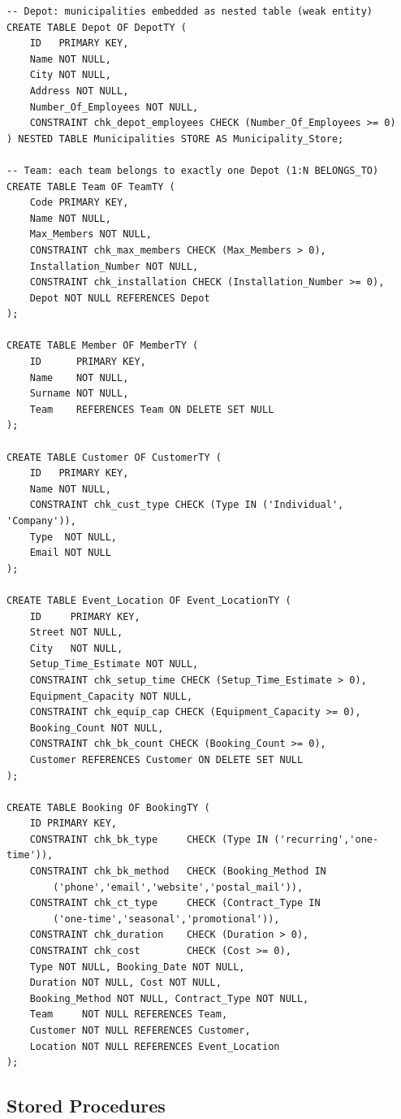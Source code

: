 \documentclass[12pt]{article}
\begin{document}
\begin{lstlisting}
-- Depot: municipalities embedded as nested table (weak entity)
CREATE TABLE Depot OF DepotTY (
    ID   PRIMARY KEY,
    Name NOT NULL,
    City NOT NULL,
    Address NOT NULL,
    Number_Of_Employees NOT NULL,
    CONSTRAINT chk_depot_employees CHECK (Number_Of_Employees >= 0)
) NESTED TABLE Municipalities STORE AS Municipality_Store;

-- Team: each team belongs to exactly one Depot (1:N BELONGS_TO)
CREATE TABLE Team OF TeamTY (
    Code PRIMARY KEY,
    Name NOT NULL,
    Max_Members NOT NULL,
    CONSTRAINT chk_max_members CHECK (Max_Members > 0),
    Installation_Number NOT NULL,
    CONSTRAINT chk_installation CHECK (Installation_Number >= 0),
    Depot NOT NULL REFERENCES Depot 
);

CREATE TABLE Member OF MemberTY (
    ID      PRIMARY KEY,
    Name    NOT NULL,
    Surname NOT NULL,
    Team    REFERENCES Team ON DELETE SET NULL
);

CREATE TABLE Customer OF CustomerTY (
    ID   PRIMARY KEY,
    Name NOT NULL,
    CONSTRAINT chk_cust_type CHECK (Type IN ('Individual', 'Company')),
    Type  NOT NULL,
    Email NOT NULL
);

CREATE TABLE Event_Location OF Event_LocationTY (
    ID     PRIMARY KEY,
    Street NOT NULL,
    City   NOT NULL,
    Setup_Time_Estimate NOT NULL,
    CONSTRAINT chk_setup_time CHECK (Setup_Time_Estimate > 0),
    Equipment_Capacity NOT NULL,
    CONSTRAINT chk_equip_cap CHECK (Equipment_Capacity >= 0),
    Booking_Count NOT NULL,
    CONSTRAINT chk_bk_count CHECK (Booking_Count >= 0),
    Customer REFERENCES Customer ON DELETE SET NULL
);

CREATE TABLE Booking OF BookingTY (
    ID PRIMARY KEY,
    CONSTRAINT chk_bk_type     CHECK (Type IN ('recurring','one-time')),
    CONSTRAINT chk_bk_method   CHECK (Booking_Method IN
        ('phone','email','website','postal_mail')),
    CONSTRAINT chk_ct_type     CHECK (Contract_Type IN
        ('one-time','seasonal','promotional')),
    CONSTRAINT chk_duration    CHECK (Duration > 0),
    CONSTRAINT chk_cost        CHECK (Cost >= 0),
    Type NOT NULL, Booking_Date NOT NULL,
    Duration NOT NULL, Cost NOT NULL,
    Booking_Method NOT NULL, Contract_Type NOT NULL,
    Team     NOT NULL REFERENCES Team,
    Customer NOT NULL REFERENCES Customer,
    Location NOT NULL REFERENCES Event_Location
);
\end{lstlisting}

\subsection{Stored Procedures}
\end{document}
